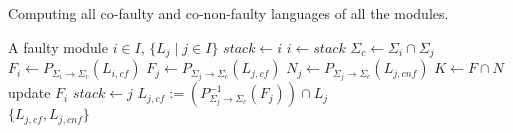 \documentclass[a4paper, 10pt, conference]{ieeeconf}
\begin{document}
% 
% 
% 

\begin{algorithm} Computing all co-faulty and co-non-faulty languages of
all the modules.
\label{alg:full_co_faulty}
\begin{algorithmic}[1]
	\Require A faulty module $i\in I$, $\{L_j\mid j \in I\}$
	\State $stack \leftarrow i$
		\State $i \leftarrow stack$
			\State $\Sigma_c \leftarrow \Sigma_i \cap \Sigma_j$ 
			\State $F_i \leftarrow P_{\Sigma_i \rightarrow \Sigma_c}(L_{i,cf})$
			\State $F_j \leftarrow P_{\Sigma_j \rightarrow \Sigma_c}(L_{j,cf})$
			\State $N_j \leftarrow P_{\Sigma_j \rightarrow \Sigma_c}(L_{j,cnf})$
			\State $K \leftarrow F \cap N$
				\State update $F_i$
				\State $stack \leftarrow j$ 
			\EndIf
		\EndFor
	\EndWhile
		\State $L_{j,cf}:=(P_{\Sigma_j \rightarrow \Sigma_c}^{-1}(F_j)) \cap L_j$
	\EndFor
	\\
	\Return $\{L_{j,cf}, L_{j,cnf}\}$
\end{algorithmic}
\end{algorithm}
\end{document}
